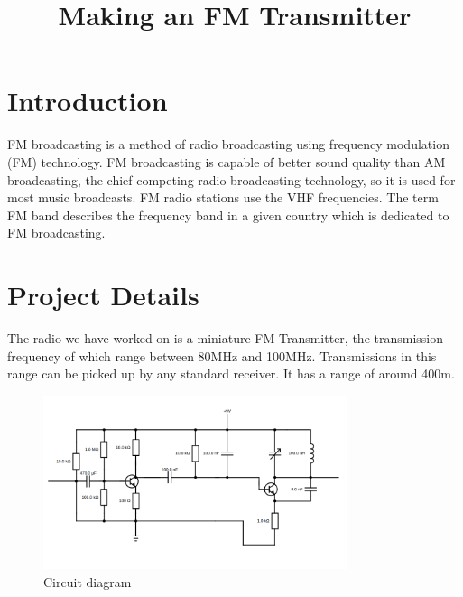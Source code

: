 \documentclass[journal,10pt,twocolumn]{IEEEtran}
\begin{document}
%






\title{Making an FM Transmitter}



\author{
\and
{}
\and
{}
\and
{}
}

\maketitle
\IEEEpeerreviewmaketitle

\section*{Introduction}
FM broadcasting is a method of radio broadcasting using frequency modulation (FM) technology. FM broadcasting is capable of better sound quality than AM broadcasting, the chief competing radio broadcasting technology, so it is used for most music broadcasts. FM radio stations use the VHF frequencies. The term FM band describes the frequency band in a given country which is dedicated to FM broadcasting.


\section*{Project Details}
The radio we have worked on is a miniature FM Transmitter, the transmission frequency of which range between 80MHz and 100MHz. Transmissions in this range can be picked up by any standard receiver. It has a range of around 400m. 
\begin{figure}[H]
\centering
\includegraphics[width=3.5in]{picture.png}
\caption{Circuit diagram}
\end{figure}
\end{document}
